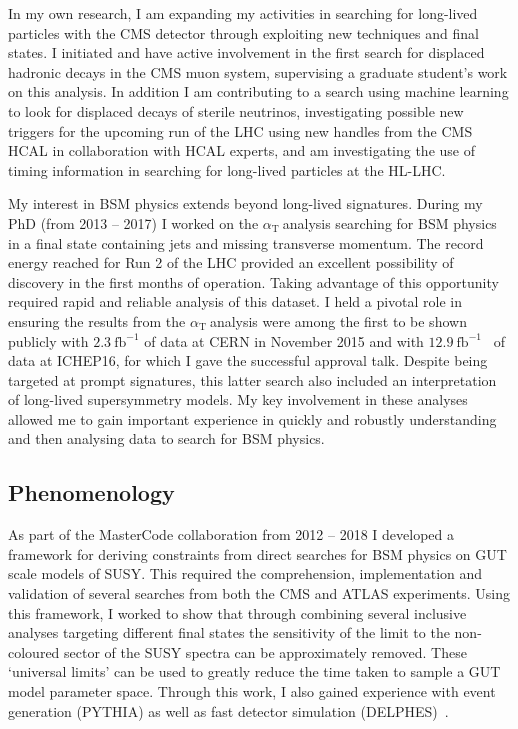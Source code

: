 \documentclass[11pt]{article}
\theoremstyle{plain} \numberwithin{equation}{section}
\theoremstyle{definition}
\DeclareRobustCommand{\alphat}{$\alpha_{\text{T}}~$}
\begin{document}
In my own research, I am expanding my activities in searching for long-lived particles with the CMS
detector through exploiting new techniques and final states. I initiated and have active involvement
in the first search for displaced hadronic decays in the CMS muon system, supervising a graduate student's
work on this analysis. In addition I am contributing to a search using machine learning to look for 
displaced decays of sterile neutrinos, investigating possible new triggers
for the upcoming run of the LHC using new handles from the CMS HCAL in collaboration with
HCAL experts, and am investigating the use of timing information 
in searching for long-lived particles at the HL-LHC.

My interest in BSM physics extends beyond long-lived signatures. 
During my PhD (from 2013 -- 2017) I worked on the \alphat analysis searching
for BSM physics in a final state containing jets and missing transverse momentum. 
The record energy reached for Run 2 of the LHC provided an excellent possibility of discovery
in the first months of operation. Taking advantage of this opportunity
required rapid and reliable analysis of this dataset. 
I held a pivotal role in ensuring the results from the \alphat analysis were among the 
first to be shown publicly with $2.3~\text{fb}^{-1}$ of data at CERN in November 2015
and with $12.9~\text{fb}^{-1}$~\cite{CMS:2016dbr} of data at ICHEP16, for which I gave the successful
approval talk. Despite being targeted at prompt signatures, this latter search also 
included an interpretation of long-lived supersymmetry 
models. My key involvement in these analyses allowed me to gain important experience 
in quickly and robustly understanding and then analysing data to search for BSM physics. 

\subsection*{Phenomenology}

As part of the MasterCode collaboration from 2012 -- 2018 I developed a framework for 
deriving constraints from direct searches for BSM physics on GUT scale models of SUSY.
This required the comprehension, implementation and validation of several 
searches from both the CMS and ATLAS experiments. 
Using this framework, I worked to show that through combining several inclusive analyses targeting 
different final states the sensitivity of the limit to the non-coloured sector of the SUSY spectra can be approximately removed. 
These `universal limits' can be used to greatly reduce the time taken to sample a GUT model parameter space. 
Through this work, I also gained experience with event generation (PYTHIA) as well as fast detector simulation (DELPHES)~\cite{deVries:2015hva}.
\end{document}
